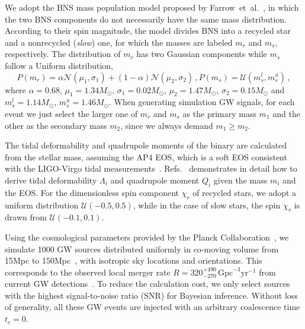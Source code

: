 \documentclass[a4paper,11pt]{article}
\begin{document}
We adopt the BNS mass population model proposed by Farrow~et~al.~\cite{Farrow:2019xnc}, in which the two BNS components do not necessarily 
have the same mass distribution. According to their spin magnitude, the model divides BNS into a recycled star and a nonrecycled 
(\emph{slow}) one, for which the masses are labeled $m_r$ and $m_s$, respectively. The distribution of $m_r$ has two Gaussian 
components while $m_s$ follow a Uniform distribution,
\begin{subequations}
\label{mass population}
\begin{equation}
    P(m_r) = \alpha \mathcal{N}(\mu_1, \sigma_1) + (1-\alpha) \mathcal{N}(\mu_2, \sigma_2)\,,
\end{equation}
\begin{equation}
    P(m_s) = \mathcal{U}(m_s^l, m_s^u)\,,
\end{equation}
\end{subequations}
where $\alpha=0.68$, $\mu_1=1.34M_{\odot}$, $\sigma_1=0.02M_{\odot}$, $\mu_2=1.47M_{\odot}$, $\sigma_2=0.15M_{\odot}$ and $m_s^l=1.14M_{\odot}$, $m_s^u=1.46M_{\odot}$. When generating simulation GW signals, for each event we just select the larger one of $m_r$ and $m_s$ as the primary mass $m_1$ and the other as the secondary mass $m_2$, since we always demand $m_1 \geq m_2$.

The tidal deformability and quadrupole moments of the binary are calculated from the stellar mass, assuming the AP4 EOS, 
which is a soft EOS consistent with the LIGO-Virgo tidal measurements~\cite{LIGOScientific:2017vwq, LIGOScientific:2018cki, LIGOScientific:2018hze}. 
Refs.~\cite{Yagi:2013awa, Atta:2024ckt} demonstrates in detail how to derive tidal deformability $\Lambda_i$ and quadrupole moment $Q_i$ 
given the mass $m_i$ and the EOS. For the dimensionless spin component $\chi_r$ of recycled stars, we adopt a uniform distribution $\mathcal{U}(-0.5,0.5)$, 
while in the case of slow stars, the spin $\chi_s$ is drawn from $\mathcal{U}(-0.1,0.1)$.

Using the cosmological parameters provided by the Planck Collaboration~\cite{Planck:2018vyg}, we simulate 1000 GW sources distributed 
uniformly in co-moving volume from 15Mpc to 150Mpc~\cite{Fishbach:2018edt, KAGRA:2021duu}, with isotropic sky locations and orientations. This corresponds to the observed local 
merger rate $R=320_{-270}^{+490}\,\mathrm{Gpc}^{-3}\mathrm{yr}^{-1}$ from current GW detections~\cite{LIGOScientific:2020aai}. 
To reduce the calculation cost, we only select sources with the highest signal-to-noise ratio (SNR) for Bayesian inference. 
Without loss of generality, all these GW events are injected with an arbitrary coalescence time $t_c=0$.
\end{document}
